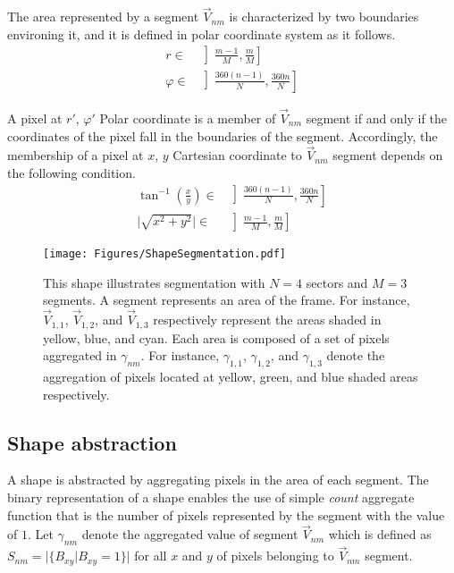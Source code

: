 The area represented by a segment $\vec{V}_{nm}$ is characterized by two boundaries environing it, and it is defined in polar coordinate system as it follows.
\begin{align} 
r \in & \left] \frac{m-1}{M}       , \frac{m}{M}    \right] \\ 
\varphi \in & \left] \frac{360 (n-1)}{N} , \frac{360n}{N} \right]
\end{align}

A pixel at $r'$, $\varphi'$ Polar coordinate is a member of $\vec{V}_{nm}$ segment if and only if the coordinates of the pixel fall in the boundaries of the segment. Accordingly, the membership of a pixel at $x$, $y$ Cartesian coordinate to $\vec{V}_{nm}$ segment depends on the following condition.
\begin{align} 
\tan^{-1}(\frac{x}{y}) \in & \left] \frac{360(n-1)}{N}, \frac{360n}{N} \right] \\
\vert \sqrt{x^2 + y^2} \vert \in & \left] \frac{m-1}{M}, \frac{m}{M} \right]
\end{align}



\begin{figure}[!t]
	\centering
	\texttt{[image: Figures/ShapeSegmentation.pdf]}
	\caption
	{
		This shape illustrates segmentation with $N=4$ sectors and $M=3$ segments. A segment represents an area of the frame. For instance, $\vec{V}_{1,1}$, $\vec{V}_{1,2}$, and $\vec{V}_{1,3}$ respectively represent the areas shaded in yellow, blue, and cyan. Each area is composed of a set of pixels aggregated in $\gamma_{nm}$. For instance, $\gamma_{1,1}$, $\gamma_{1,2}$, and $\gamma_{1,3}$ denote the aggregation of pixels located at yellow, green, and blue shaded areas respectively.
	}
	\label{Figure: ShapeSegmentation}
\end{figure}

\subsection{Shape abstraction}
A shape is abstracted by aggregating pixels in the area of each segment. The binary representation of a shape enables the use of simple \textit{count} aggregate function that is the number of pixels represented by the segment with the value of $1$. Let $\gamma_{nm}$ denote the aggregated value of segment $\vec{V}_{nm}$ which is defined as $S_{nm} = \vert \{B_{xy} \vert B_{xy} = 1 \}  \vert$ for all $x$ and $y$ of pixels belonging to $\vec{V}_{nm}$ segment.

